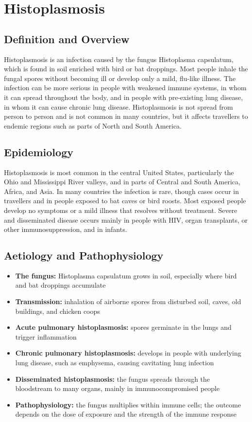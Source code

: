 \chapter{Histoplasmosis}

\section*{Definition and Overview}
Histoplasmosis is an infection caused by the fungus Histoplasma capsulatum, which is found in soil enriched with bird or bat droppings. Most people inhale the fungal spores without becoming ill or develop only a mild, flu-like illness. The infection can be more serious in people with weakened immune systems, in whom it can spread throughout the body, and in people with pre-existing lung disease, in whom it can cause chronic lung disease. Histoplasmosis is not spread from person to person and is not common in many countries, but it affects travellers to endemic regions such as parts of North and South America.

\section*{Epidemiology}
Histoplasmosis is most common in the central United States, particularly the Ohio and Mississippi River valleys, and in parts of Central and South America, Africa, and Asia. In many countries the infection is rare, though cases occur in travellers and in people exposed to bat caves or bird roosts. Most exposed people develop no symptoms or a mild illness that resolves without treatment. Severe and disseminated disease occurs mainly in people with HIV, organ transplants, or other immunosuppression, and in infants.

\section*{Aetiology and Pathophysiology}
\begin{itemize}
    \item \textbf{The fungus:} Histoplasma capsulatum grows in soil, especially where bird and bat droppings accumulate
    \item \textbf{Transmission:} inhalation of airborne spores from disturbed soil, caves, old buildings, and chicken coops
    \item \textbf{Acute pulmonary histoplasmosis:} spores germinate in the lungs and trigger inflammation
    \item \textbf{Chronic pulmonary histoplasmosis:} develops in people with underlying lung disease, such as emphysema, causing cavitating lung infection
    \item \textbf{Disseminated histoplasmosis:} the fungus spreads through the bloodstream to many organs, mainly in immunocompromised people
    \item \textbf{Pathophysiology:} the fungus multiplies within immune cells; the outcome depends on the dose of exposure and the strength of the immune response
\end{itemize}

